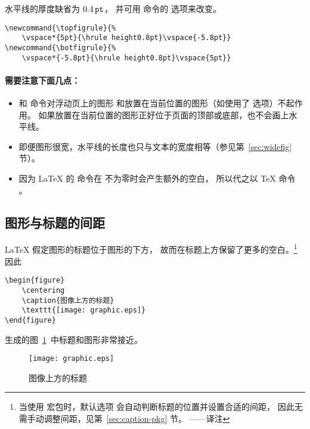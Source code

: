 水平线的厚度缺省为 $0.4\,\mathtt{pt}$，
并可用  命令的  选项来改变。
\begin{lstlisting}
\newcommand{\topfigrule}{% 
	\vspace*{5pt}{\hrule height0.8pt}\vspace{-5.8pt}} 
\newcommand{\botfigrule}{% 
	\vspace*{-5.8pt}{\hrule height0.8pt}\vspace{5pt}}
\end{lstlisting}

\paragraph{需要注意下面几点：}
\begin{itemize}
	\item {} 和  命令对浮动页上的图形
	和放置在当前位置的图形（如使用了 选项）不起作用。
	如果放置在当前位置的图形正好位于页面的顶部或底部，也不会画上水平线。
	\item 即便图形很宽，水平线的长度也只与文本的宽度相等（参见第~\ref{sec:widefig} 节）。
	\item 因为 \LaTeX{} 的  命令在  不为零时会产生额外的空白，
	所以代之以 \TeX{} 命令 。
\end{itemize}


\subsection{图形与标题的间距}\label{ssec:capspace}

\LaTeX{} 假定图形的标题位于图形的下方，
故而在标题上方保留了更多的空白。\footnote{
    当使用  宏包时，默认选项  会自动判断标题的位置并设置合适的间距，
    因此无需手动调整间距，见第~\ref{sec:caption-pkg} 节。 ——译注}
因此
\begin{lstlisting}
\begin{figure} 
	\centering 
	\caption{图像上方的标题} 
	\texttt{[image: graphic.eps]} 
\end{figure}
\end{lstlisting}
生成的图~\ref{fig:verynearcap}~中标题和图形非常接近。

\begin{figure}[ht]
    \captionsetup{position=below}
	\centering 
	\caption{图像上方的标题} \label{fig:verynearcap}
	\texttt{[image: graphic.eps]} 
\end{figure}


